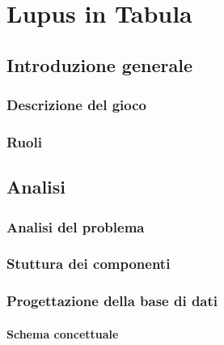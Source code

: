 \documentclass[10pt,twoside,cucitura]{toptesi}
\begin{document}
\frontespizio

\sommario


\indici

\mainmatter

\part{Lupus in Tabula}
\label{part:part1}

\chapter{Introduzione generale}

\section{Descrizione del gioco}


\section{Ruoli}


\chapter{Analisi}

\section{Analisi del problema}


\section{Stuttura dei componenti}


\section{Progettazione della base di dati}


\subsection{Schema concettuale}

\end{document}
